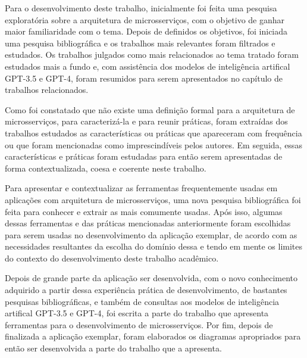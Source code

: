 Para o desenvolvimento deste trabalho, inicialmente foi feita uma pesquisa exploratória sobre a arquitetura de microsserviços, com o objetivo de ganhar maior familiaridade com o tema. Depois de definidos os objetivos, foi iniciada uma pesquisa bibliográfica e os trabalhos mais relevantes foram filtrados e estudados. Os trabalhos julgados como mais relacionados ao tema tratado foram estudados mais a fundo e, com assistência dos modelos de inteligência artifical GPT-3.5 e GPT-4, foram resumidos para serem apresentados no capítulo de trabalhos relacionados.

Como foi constatado que não existe uma definição formal para a arquitetura de microsserviços, para caracterizá-la e para reunir práticas, foram extraídas dos trabalhos estudados as características ou práticas que apareceram com frequência ou que foram mencionadas como imprescindíveis pelos autores. Em seguida, essas características e práticas foram estudadas para então serem apresentadas de forma contextualizada, coesa e coerente neste trabalho.




Para apresentar e contextualizar as ferramentas frequentemente usadas em aplicações com arquitetura de microsserviços, uma nova pesquisa bibliográfica foi feita para conhecer e extrair as mais comumente usadas. Após isso, algumas dessas ferramentas e das práticas mencionadas anteriormente foram escolhidas para serem usadas no desenvolvimento da aplicação exemplar, de acordo com as necessidades resultantes da escolha do domínio dessa e tendo em mente os limites do contexto do desenvolvimento deste trabalho acadêmico.

Depois de grande parte da aplicação ser desenvolvida, com o novo conhecimento adquirido a partir dessa experiência prática de desenvolvimento, de bastantes pesquisas bibliográficas, e também de consultas aos modelos de inteligência artifical GPT-3.5 e GPT-4, foi escrita a parte do trabalho que apresenta ferramentas para o desenvolvimento de microsserviços. Por fim, depois de finalizada a aplicação exemplar, foram elaborados os diagramas apropriados para então ser desenvolvida a parte do trabalho que a apresenta.


